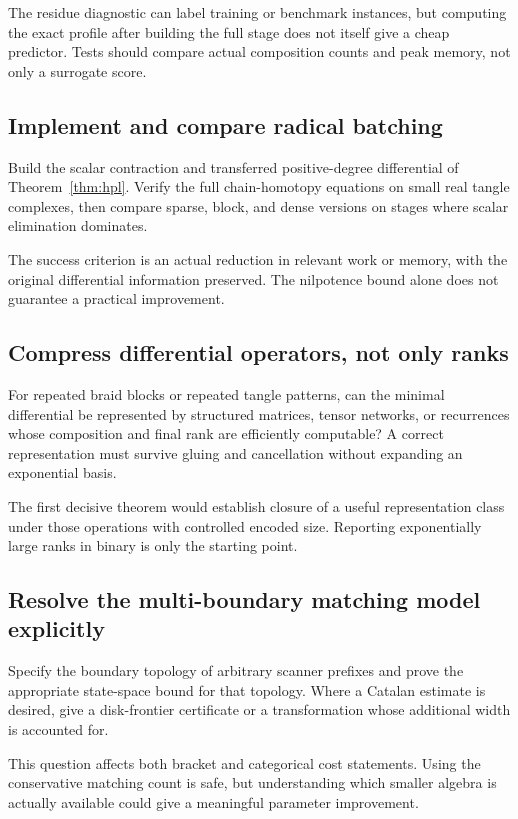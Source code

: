 \documentclass[11pt,letterpaper]{article}
\theoremstyle{definition}
\begin{document}
The residue diagnostic can label training or benchmark instances,
but computing the exact profile after building the full stage does
not itself give a cheap predictor. Tests should compare actual
composition counts and peak memory, not only a surrogate score.

\subsection{Implement and compare radical batching}

Build the scalar contraction and transferred positive-degree
differential of Theorem~\ref{thm:hpl}. Verify the full
chain-homotopy equations on small real tangle complexes, then compare
sparse, block, and dense versions on stages where scalar elimination
dominates.

The success criterion is an actual reduction in relevant work or
memory, with the original differential information preserved.
The nilpotence bound alone does not guarantee a practical improvement.

\subsection{Compress differential operators, not only ranks}

For repeated braid blocks or repeated tangle patterns, can the minimal
differential be represented by structured matrices, tensor networks,
or recurrences whose composition and final rank are efficiently
computable? A correct representation must survive gluing and
cancellation without expanding an exponential basis.

The first decisive theorem would establish closure of a useful
representation class under those operations with controlled encoded
size. Reporting exponentially large ranks in binary is only the
starting point.

\subsection{Resolve the multi-boundary matching model explicitly}

Specify the boundary topology of arbitrary scanner prefixes and prove
the appropriate state-space bound for that topology.
Where a Catalan estimate is desired, give a disk-frontier certificate
or a transformation whose additional width is accounted for.

This question affects both bracket and categorical cost statements.
Using the conservative matching count is safe, but understanding
which smaller algebra is actually available could give a meaningful
parameter improvement.
\end{document}
